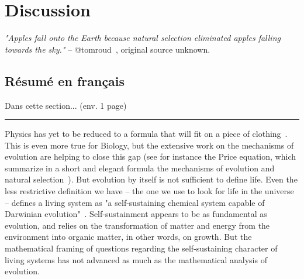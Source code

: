 \chapter{Discussion}
\label{chap:discussion}

\textit{"Apples fall onto the Earth because natural selection eliminated apples falling towards the sky."} -- @tomroud~\cite{tomroud_tom_2016}, original source unknown.

\section*{Résumé en français}

Dans cette section... (env. 1 page)

\begin{center}
\noindent\rule{4cm}{0.1pt}
\end{center}

Physics has yet to be reduced to a formula that will fit on a piece of clothing~\cite{falk_universe_2005}.
This is even more true for Biology, but the extensive work on the mechanisms of evolution are helping to close this gap (see for instance the Price equation, which summarize in a short and elegant formula the mechanisms of evolution and natural selection~\cite{frank_natural_2012}).
But evolution by itself is not sufficient to define life.
Even the less restrictive definition we have -- the one we use to look for life in the universe -- defines a living system as "a self-sustaining chemical system capable of Darwinian evolution"~\cite{deamer_origins_1994,benner_defining_2010}.
Self-sustainment appears to be as fundamental as evolution, and relies on the transformation of matter and energy from the environment into organic matter, in other words, on growth.
But the mathematical framing of questions regarding the self-sustaining character of living systems has not advanced as much as the mathematical analysis of evolution.

